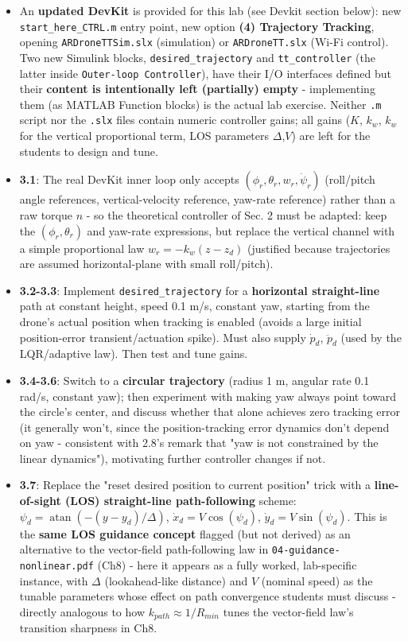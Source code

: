 \documentclass[11pt]{article}
\begin{document}
\begin{itemize}
\item An \textbf{updated DevKit} is provided for this lab (see Devkit section below): new \texttt{start\_\allowbreak{}here\_\allowbreak{}CTRL.m} entry point, new option \textbf{(4) Trajectory Tracking}, opening \texttt{ARDroneTTSim.slx} (simulation) or \texttt{ARDroneTT.slx} (Wi-Fi control). Two new Simulink blocks, \texttt{desired\_\allowbreak{}trajectory} and \texttt{tt\_\allowbreak{}controller} (the latter inside \texttt{Outer-loop Controller}), have their I/O interfaces defined but their \textbf{content is intentionally left (partially) empty} - implementing them (as MATLAB Function blocks) is the actual lab exercise. Neither \texttt{.m} script nor the \texttt{.slx} files contain numeric controller gains; all gains ($K$, $k_w$, $k_w$ for the vertical proportional term, LOS parameters $\Delta$,$V$) are left for the students to design and tune.
\item \textbf{3.1}: The real DevKit inner loop only accepts $(\phi_r, \theta_r, w_r, \dot\psi_r)$ (roll/pitch angle references, vertical-velocity reference, yaw-rate reference) rather than a raw torque $n$ - so the theoretical controller of Sec. 2 must be adapted: keep the $(\phi_r,\theta_r)$ and yaw-rate expressions, but replace the vertical channel with a simple proportional law $w_r = -k_w(z-z_d)$ (justified because trajectories are assumed horizontal-plane with small roll/pitch).
\item \textbf{3.2-3.3}: Implement \texttt{desired\_\allowbreak{}trajectory} for a \textbf{horizontal straight-line} path at constant height, speed 0.1 m/s, constant yaw, starting from the drone's actual position when tracking is enabled (avoids a large initial position-error transient/actuation spike). Must also supply $\dot p_d$, $\ddot p_d$ (used by the LQR/adaptive law). Then test and tune gains.
\item \textbf{3.4-3.6}: Switch to a \textbf{circular trajectory} (radius 1 m, angular rate 0.1 rad/s, constant yaw); then experiment with making yaw always point toward the circle's center, and discuss whether that alone achieves zero tracking error (it generally won't, since the position-tracking error dynamics don't depend on yaw - consistent with 2.8's remark that "yaw is not constrained by the linear dynamics"), motivating further controller changes if not.
\item \textbf{3.7}: Replace the "reset desired position to current position" trick with a \textbf{line-of-sight (LOS) straight-line path-following} scheme: $\psi_d = \operatorname{atan}(-(y-y_d)/\Delta)$, $\dot x_d = V\cos(\psi_d)$, $\dot y_d = V\sin(\psi_d)$. This is the \textbf{same LOS guidance concept} flagged (but not derived) as an alternative to the vector-field path-following law in \texttt{04-\allowbreak{}guidance-\allowbreak{}nonlinear.pdf} (Ch8) - here it appears as a fully worked, lab-specific instance, with $\Delta$ (lookahead-like distance) and $V$ (nominal speed) as the tunable parameters whose effect on path convergence students must discuss - directly analogous to how $k_{path}\approx 1/R_{min}$ tunes the vector-field law's transition sharpness in Ch8.
\end{itemize}
\end{document}
